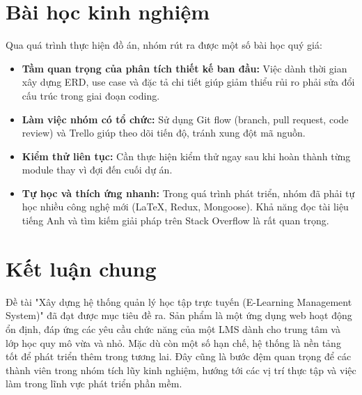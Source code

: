 \section{Bài học kinh nghiệm}
Qua quá trình thực hiện đồ án, nhóm rút ra được một số bài học quý giá:
\begin{itemize}
    \item \textbf{Tầm quan trọng của phân tích thiết kế ban đầu:} Việc dành thời gian xây dựng ERD, use case và đặc tả chi tiết giúp giảm thiểu rủi ro phải sửa đổi cấu trúc trong giai đoạn coding.
    \item \textbf{Làm việc nhóm có tổ chức:} Sử dụng Git flow (branch, pull request, code review) và Trello giúp theo dõi tiến độ, tránh xung đột mã nguồn.
    \item \textbf{Kiểm thử liên tục:} Cần thực hiện kiểm thử ngay sau khi hoàn thành từng module thay vì đợi đến cuối dự án.
    \item \textbf{Tự học và thích ứng nhanh:} Trong quá trình phát triển, nhóm đã phải tự học nhiều công nghệ mới (LaTeX, Redux, Mongoose). Khả năng đọc tài liệu tiếng Anh và tìm kiếm giải pháp trên Stack Overflow là rất quan trọng.
\end{itemize}

\section{Kết luận chung}
Đề tài "Xây dựng hệ thống quản lý học tập trực tuyến (E-Learning Management System)" đã đạt được mục tiêu đề ra. Sản phẩm là một ứng dụng web hoạt động ổn định, đáp ứng các yêu cầu chức năng của một LMS dành cho trung tâm và lớp học quy mô vừa và nhỏ. Mặc dù còn một số hạn chế, hệ thống là nền tảng tốt để phát triển thêm trong tương lai. Đây cũng là bước đệm quan trọng để các thành viên trong nhóm tích lũy kinh nghiệm, hướng tới các vị trí thực tập và việc làm trong lĩnh vực phát triển phần mềm.